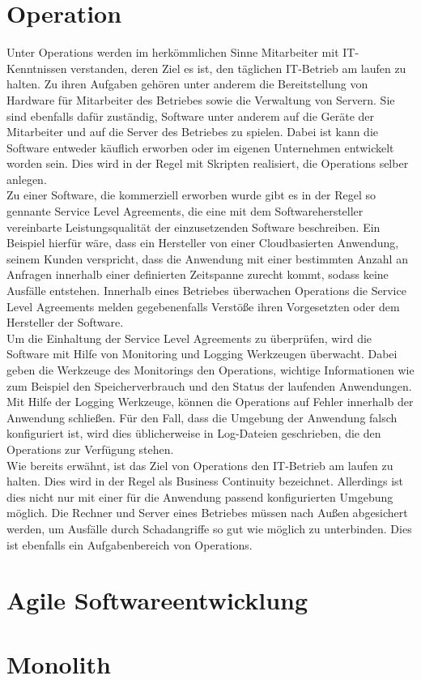 \section{Operation}
Unter Operations werden im herkömmlichen Sinne Mitarbeiter mit IT-Kenntnissen verstanden, deren Ziel es ist, den täglichen IT-Betrieb am laufen zu halten. Zu ihren Aufgaben gehören unter anderem die Bereitstellung von Hardware für Mitarbeiter des Betriebes sowie die Verwaltung von Servern. Sie sind ebenfalls dafür zuständig, Software unter anderem auf die Geräte der Mitarbeiter und auf die Server des Betriebes zu spielen. Dabei ist kann die Software entweder käuflich erworben oder im eigenen Unternehmen entwickelt worden sein. Dies wird in der Regel mit Skripten realisiert, die Operations selber anlegen.\\
Zu einer Software, die kommerziell erworben wurde gibt es in der Regel so gennante Service Level Agreements, die eine mit dem Softwarehersteller vereinbarte Leistungsqualität der einzusetzenden Software beschreiben. Ein Beispiel hierfür wäre, dass ein Hersteller von einer Cloudbasierten Anwendung, seinem Kunden verspricht, dass die Anwendung mit einer bestimmten Anzahl an Anfragen innerhalb einer definierten Zeitspanne zurecht kommt, sodass keine Ausfälle entstehen. Innerhalb eines Betriebes überwachen Operations die Service Level Agreements melden gegebenenfalls Verstöße ihren Vorgesetzten oder dem Hersteller der Software. \\
Um die Einhaltung der Service Level Agreements zu überprüfen, wird die Software mit Hilfe von Monitoring und Logging Werkzeugen überwacht. Dabei geben die Werkzeuge des Monitorings den Operations, wichtige Informationen wie zum Beispiel den Speicherverbrauch und den Status der laufenden Anwendungen. Mit Hilfe der Logging Werkzeuge, können die Operations auf Fehler innerhalb der Anwendung schließen. Für den Fall, dass die Umgebung der Anwendung falsch konfiguriert ist, wird dies üblicherweise in Log-Dateien geschrieben, die den Operations zur Verfügung stehen. \\
Wie bereits erwähnt, ist das Ziel von Operations den IT-Betrieb am laufen zu halten. Dies wird in der Regel als Business Continuity bezeichnet. Allerdings ist dies nicht nur mit einer für die Anwendung passend konfigurierten Umgebung möglich. Die Rechner und Server eines Betriebes müssen nach Außen abgesichert werden, um Ausfälle durch Schadangriffe so gut wie möglich zu unterbinden. Dies ist ebenfalls ein Aufgabenbereich von Operations.

\section{Agile Softwareentwicklung}

\section{Monolith}

